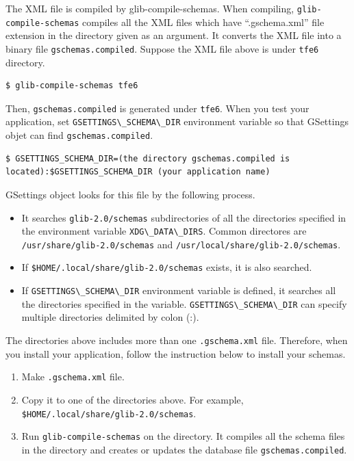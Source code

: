 The XML file is compiled by glib-compile-schemas. When compiling,
\passthrough{\lstinline!glib-compile-schemas!} compiles all the XML
files which have ``.gschema.xml'' file extension in the directory given
as an argument. It converts the XML file into a binary file
\passthrough{\lstinline!gschemas.compiled!}. Suppose the XML file above
is under \passthrough{\lstinline!tfe6!} directory.

\begin{lstlisting}
$ glib-compile-schemas tfe6
\end{lstlisting}

Then, \passthrough{\lstinline!gschemas.compiled!} is generated under
\passthrough{\lstinline!tfe6!}. When you test your application, set
\passthrough{\lstinline!GSETTINGS\_SCHEMA\_DIR!} environment variable so
that GSettings objet can find
\passthrough{\lstinline!gschemas.compiled!}.

\begin{lstlisting}
$ GSETTINGS_SCHEMA_DIR=(the directory gschemas.compiled is located):$GSETTINGS_SCHEMA_DIR (your application name)
\end{lstlisting}

GSettings object looks for this file by the following process.

\begin{itemize}
\tightlist
\item
  It searches \passthrough{\lstinline!glib-2.0/schemas!} subdirectories
  of all the directories specified in the environment variable
  \passthrough{\lstinline!XDG\_DATA\_DIRS!}. Common directores are
  \passthrough{\lstinline!/usr/share/glib-2.0/schemas!} and
  \passthrough{\lstinline!/usr/local/share/glib-2.0/schemas!}.
\item
  If \passthrough{\lstinline!$HOME/.local/share/glib-2.0/schemas!}
  exists, it is also searched.
\item
  If \passthrough{\lstinline!GSETTINGS\_SCHEMA\_DIR!} environment
  variable is defined, it searches all the directories specified in the
  variable. \passthrough{\lstinline!GSETTINGS\_SCHEMA\_DIR!} can specify
  multiple directories delimited by colon (:).
\end{itemize}

The directories above includes more than one
\passthrough{\lstinline!.gschema.xml!} file. Therefore, when you install
your application, follow the instruction below to install your schemas.

\begin{enumerate}
\def\labelenumi{\arabic{enumi}.}
\tightlist
\item
  Make \passthrough{\lstinline!.gschema.xml!} file.
\item
  Copy it to one of the directories above. For example,
  \passthrough{\lstinline!$HOME/.local/share/glib-2.0/schemas!}.
\item
  Run \passthrough{\lstinline!glib-compile-schemas!} on the directory.
  It compiles all the schema files in the directory and creates or
  updates the database file \passthrough{\lstinline!gschemas.compiled!}.
\end{enumerate}


